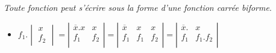 \bigskip 

\textsl{Toute fonction peut s'écrire sous la forme d'une fonction carrée biforme}. 

\bigskip 

\begin{itemize}
\item $f_1 . \begin{vmatrix}
                   x \\  f_2 
                 \end{vmatrix} 
                   =  \left| \begin{array}{c|c} 
                                  \overline{x} . x & x \\
                                  f_1 & f_2  \\
                             \end{array} \right|
                             = \left| \begin{array}{c|c|c}  
                                     \overline{x} &   x & x \\
                                       f_1 & f_1 & f_2  \\
                                      \end{array} \right| 
                                      = \left| \begin{array}{c|c} 
                                          \overline{x} . & x \\
                                          f_1 & f_1 . f_2  \\
                                     \end{array} \right| $ 

\bigskip 
                                    

\end{itemize}
